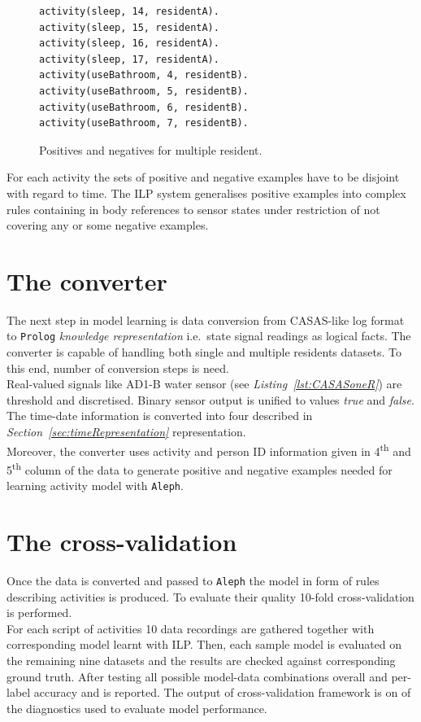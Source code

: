 \documentclass[12pt, a4paper, pdflatex, leqno, twoside, openright]{report}
\newcommand{\ts}{\textsuperscript}
\begin{document}
\begin{figure}[htb] %
  \begin{verbatim}
activity(sleep, 14, residentA).
activity(sleep, 15, residentA).
activity(sleep, 16, residentA).
activity(sleep, 17, residentA).
activity(useBathroom, 4, residentB).
activity(useBathroom, 5, residentB).
activity(useBathroom, 6, residentB).
activity(useBathroom, 7, residentB).
  \end{verbatim}
  \caption{Positives and negatives for multiple resident.\label{lst:multiposneg}}
\end{figure}

For each activity the sets of positive and negative examples have to be disjoint with regard to time. The ILP system generalises positive examples into complex rules containing in body references to sensor states under restriction of not covering any or some negative examples.

  \section{The converter}
The next step in model learning is data conversion from CASAS-like log format to \texttt{Prolog} \emph{knowledge representation} i.e.\ state signal readings as logical facts. The converter is capable of handling both single and multiple residents datasets. To this end, number of conversion steps is need.\\

Real-valued signals like AD1-B water sensor (see \emph{Listing~\ref{lst:CASASoneR}}) are threshold and discretised. Binary sensor output is unified to values \emph{true} and \emph{false}. The time-date information is converted into four described in \emph{Section~\ref{sec:timeRepresentation}} representation.\\
Moreover, the converter uses activity and person ID information given in 4\ts{th} and 5\ts{th} column of the data to generate positive and negative examples needed for learning activity model with \texttt{Aleph}.

  \section{The cross-validation}
Once the data is converted and passed to \texttt{Aleph} the model in form of rules describing activities is produced. To evaluate their quality 10-fold cross-validation is performed.\\
For each script of activities 10 data recordings are gathered together with corresponding model learnt with ILP. Then, each sample model is evaluated on the remaining nine datasets and the results are checked against corresponding ground truth. After testing all possible model-data combinations overall and per-label accuracy and is reported. The output of cross-validation framework is on of the diagnostics used to evaluate model performance.
\end{document}
